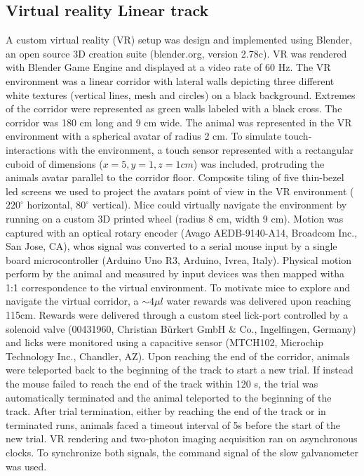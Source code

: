 \subsection{Virtual reality Linear track}
\label{chap3:sec:3:subsec1:linear-track-tracking}
A custom virtual reality (VR) setup was design and implemented using Blender, an open source 3D creation suite (blender.org, version 2.78c). 
VR was rendered with Blender Game Engine and displayed at a video rate of 60 Hz. 
The VR environment was a linear corridor with lateral walls depicting three different white textures (vertical lines, mesh and circles) on a black background. 
Extremes of the corridor were represented as green walls labeled with a black cross.
The corridor was 180 cm long and 9 cm wide. 
The animal was represented in the VR environment with a spherical avatar of radius 2 cm.
To simulate touch-interactions with the environment, a touch sensor represented with a rectangular cuboid of dimensions ($x = 5, y = 1, z = 1 cm$) was included, protruding the animals avatar parallel to the corridor floor.
Composite tiling of five thin-bezel led screens we used to project the avatars point of view in the VR environment ($220^{\circ}$ horizontal, $80^{\circ}$ vertical). 
Mice could virtually navigate the environment by running on a custom 3D printed wheel (radius 8 cm, width 9 cm). 
Motion was captured with an optical rotary encoder (Avago AEDB-9140-A14, Broadcom Inc., San Jose, CA), whos signal was converted to a serial mouse input by a single board microcontroller (Arduino Uno R3, Arduino, Ivrea, Italy). 
Physical motion perform by the animal and measured by input devices was then mapped witha 1:1 correspondence to the virtual environment. 
To motivate mice to explore and navigate the virtual corridor, a $\sim 4 \mu l$ water rewards was delivered upon reaching 115cm. 
Rewards were delivered through a custom steel lick-port controlled by a solenoid valve (00431960, Christian Bürkert GmbH \& Co., Ingelfingen, Germany) and licks were monitored using a capacitive sensor (MTCH102, Microchip Technology Inc., Chandler, AZ). 
Upon reaching the end of the corridor, animals were teleported back to the beginning of the track to start a new trial.
If instead the mouse failed to reach the end of the track within 120 s, the trial was automatically terminated and the animal teleported to the beginning of the track. 
After trial termination, either by reaching the end of the track or in terminated runs, animals faced a timeout interval of 5s before the start of the new trial.
VR rendering and two-photon imaging acquisition ran on asynchronous clocks.
To synchronize both signals, the command signal of the slow galvanometer was used.

